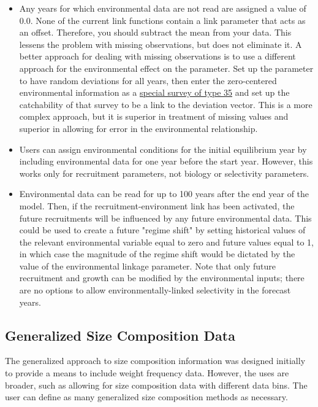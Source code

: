 	\begin{itemize}
		\item Any years for which environmental data are not read are assigned a value of 0.0. None of the current link functions contain a link parameter that acts as an offset.  Therefore, you should subtract the mean from your data. This lessens the problem with missing observations, but does not eliminate it. A better approach for dealing with missing observations is to use a different approach for the environmental effect on the parameter.  Set up the parameter to have random deviations for all years, then enter the zero-centered environmental information as a \hyperlink{SpecialSurvey}{special survey of type 35} and set up the catchability of that survey to be a link to the deviation vector.  This is a more complex approach, but it is superior in treatment of missing values and superior in allowing for error in the environmental relationship.
		\item Users can assign environmental conditions for the initial equilibrium year by including environmental data for one year before the start year. However, this works only for recruitment parameters, not biology or selectivity parameters.
		\item Environmental data can be read for up to 100 years after the end year of the model. Then, if the recruitment-environment link has been activated, the future recruitments will be influenced by any future environmental data. This could be used to create a future "regime shift" by setting historical values of the relevant environmental variable equal to zero and future values equal to 1, in which case the magnitude of the regime shift would be dictated by the value of the environmental linkage parameter. Note that only future recruitment and growth can be modified by the environmental inputs; there are no options to allow environmentally-linked selectivity in the forecast years.
	\end{itemize}

\subsection{Generalized Size Composition Data}
The generalized approach to size composition information was designed initially to provide a means to include weight frequency data. However, the uses are broader, such as allowing for size composition data with different data bins. The user can define as many generalized size composition methods as necessary.

